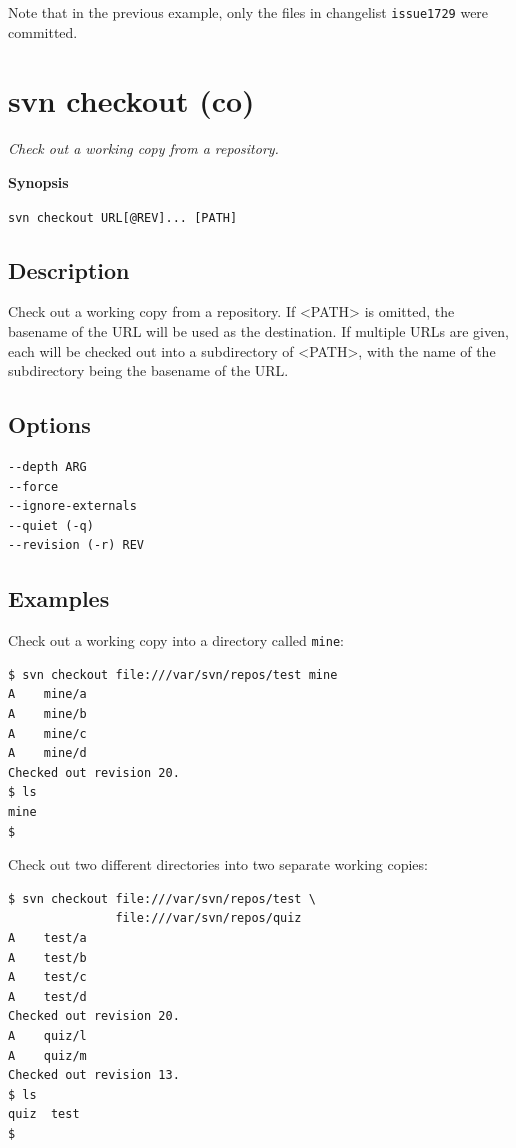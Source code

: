 Note that in the previous example, only the files in changelist
\texttt{issue1729} were committed.

\section{svn checkout (co)}\label{svn.ref.svn.c.checkout}

\emph{Check out a working copy from a repository.}

\textbf{Synopsis}

\texttt{svn\ checkout\ URL{[}@REV{]}...\ {[}PATH{]}}

\subsection{Description}

Check out a working copy from a repository. If
\textless PATH\textgreater{} is omitted, the basename of the URL will be
used as the destination. If multiple URLs are given, each will be
checked out into a subdirectory of \textless PATH\textgreater, with the
name of the subdirectory being the basename of the URL.

\subsection{Options}

\begin{verbatim}
--depth ARG
--force
--ignore-externals
--quiet (-q)
--revision (-r) REV
\end{verbatim}

\subsection{Examples}

Check out a working copy into a directory called \texttt{mine}:

\begin{verbatim}
$ svn checkout file:///var/svn/repos/test mine
A    mine/a
A    mine/b
A    mine/c
A    mine/d
Checked out revision 20.
$ ls
mine
$
\end{verbatim}

Check out two different directories into two separate working copies:

\begin{verbatim}
$ svn checkout file:///var/svn/repos/test \
               file:///var/svn/repos/quiz
A    test/a
A    test/b
A    test/c
A    test/d
Checked out revision 20.
A    quiz/l
A    quiz/m
Checked out revision 13.
$ ls
quiz  test
$
\end{verbatim}

